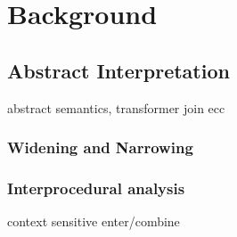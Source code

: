 \chapter{Background}

\section{Abstract Interpretation}
abstract semantics, transformer join ecc
\subsection{Widening and Narrowing}

\subsection{Interprocedural analysis}

context sensitive
enter/combine



